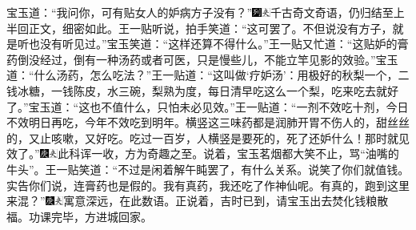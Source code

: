 宝玉道：“我问你，可有贴女人的妒病方子没有？”{\includegraphics[width=3mm]{../Images/00007}\includegraphics[width=3mm]{../Images/00012}\footnotesize \kaishu 千古奇文奇语，仍归结至上半回正文，细密如此。}王一贴听说，拍手笑道：“这可罢了。不但说没有方子，就是听也没有听见过。”宝玉笑道：“这样还算不得什么。”王一贴又忙道：“这贴妒的膏药倒没经过，倒有一种汤药或者可医，只是慢些儿，不能立竿见影的效验。”宝玉道：“什么汤药，怎么吃法？”王一贴道：“这叫做‘疗妒汤’：用极好的秋梨一个，二钱冰糖，一钱陈皮，水三碗，梨熟为度，每日清早吃这么一个梨，吃来吃去就好了。”宝玉道：“这也不值什么，只怕未必见效。”王一贴道：“一剂不效吃十剂，今日不效明日再吃，今年不效吃到明年。横竖这三味药都是润肺开胃不伤人的，甜丝丝的，又止咳嗽，又好吃。吃过一百岁，人横竖是要死的，死了还妒什么！那时就见效了。”{\includegraphics[width=3mm]{../Images/00004}\includegraphics[width=3mm]{../Images/00012}\footnotesize \kaishu 此科诨一收，方为奇趣之至。}说着，宝玉茗烟都大笑不止，骂“油嘴的牛头”。王一贴笑道：“不过是闲着解午盹罢了，有什么关系。说笑了你们就值钱。实告你们说，连膏药也是假的。我有真药，我还吃了作神仙呢。有真的，跑到这里来混？”{\includegraphics[width=3mm]{../Images/00004}\includegraphics[width=3mm]{../Images/00012}\footnotesize \kaishu 寓意深远，在此数语。}正说着，吉时已到，请宝玉出去焚化钱粮散福。功课完毕，方进城回家。

